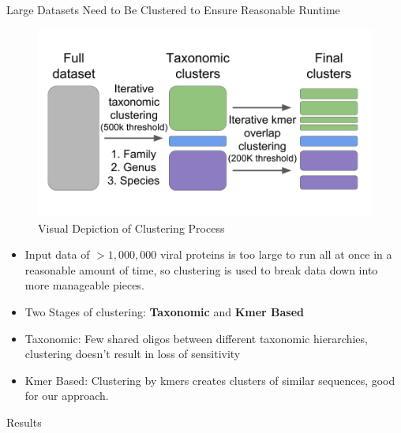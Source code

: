 \documentclass[final]{beamer}
\newlength{\colwidth}
\begin{document}
\begin{frame}[t]
\begin{columns}[t]
\begin{column}{\colwidth}
  \begin{block}{Large Datasets Need to Be Clustered to Ensure Reasonable Runtime}
    \begin{figure}
      \includegraphics[width=0.5\colwidth]{figures/clustering.png}
      \caption{Visual Depiction of Clustering Process}
      \label{fig:clustering}
    \end{figure}
    \begin{itemize}
    \item Input data of $>1,000,000$ viral proteins is too large to run all at once in a reasonable amount of time,
      so clustering is used to break data down into more manageable pieces.
    \item Two Stages of clustering: \textbf{Taxonomic} and \textbf{Kmer Based}
    \item Taxonomic: Few shared oligos between different taxonomic hierarchies,
      clustering doesn't result in loss of sensitivity
    \item Kmer Based: Clustering by kmers creates clusters of similar sequences,
      good for our approach.
    \end{itemize}

  \end{block}

  \begin{block}{Results}


\end{block}
\end{column}
\end{columns}
\end{frame}
\end{document}
